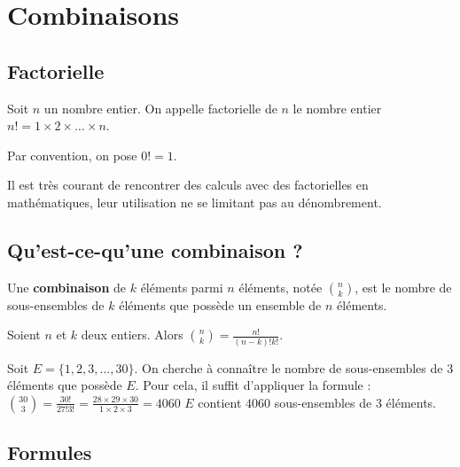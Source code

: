 	\section{Combinaisons}
	
	\subsection{Factorielle}
	
	\begin{formula}[Définition]
		Soit $n$ un nombre entier. On appelle factorielle de $n$ le nombre entier $n! = 1 \times 2 \times \dots \times n$.
	\end{formula}
	
	\begin{tip}[Convention]
		Par convention, on pose $0! = 1$.
	\end{tip}
	
	Il est très courant de rencontrer des calculs avec des factorielles en mathématiques, leur utilisation ne se limitant pas au dénombrement.
	
	\subsection{Qu'est-ce-qu'une combinaison ?}
	
	\begin{formula}[Définition]
		Une \textbf{combinaison} de $k$ éléments parmi $n$ éléments, notée $\displaystyle{\binom{n}{k}}$, est le nombre de sous-ensembles de $k$ éléments que possède un ensemble de $n$ éléments.
	\end{formula}
	
	\begin{formula}
		Soient $n$ et $k$ deux entiers. Alors $\displaystyle{\binom{n}{k} = \frac{n!}{(n-k)!k!}}$.
	\end{formula}
	
	\begin{tip}[Exemple]
		Soit $E = \{1, 2, 3, \dots, 30 \}$. On cherche à connaître le nombre de sous-ensembles de $3$ éléments que possède $E$. Pour cela, il suffit d'appliquer la formule :
		\newpar
		$\displaystyle{\binom{30}{3} = \frac{30!}{27!3!} = \frac{28 \times 29 \times 30}{1 \times 2 \times 3} = 4060}$
		\newpar
		$E$ contient $4060$ sous-ensembles de $3$ éléments.
	\end{tip}
	
	\subsection{Formules}
	
